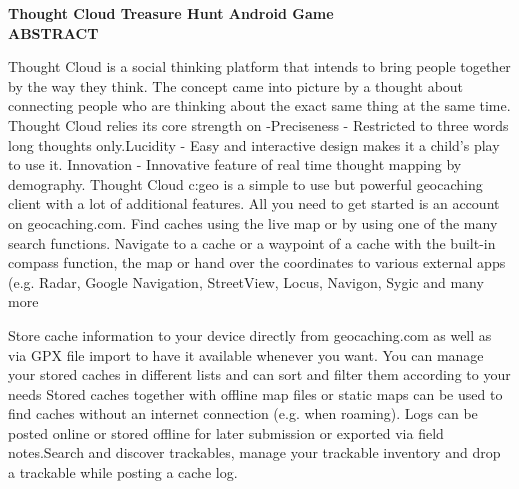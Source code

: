 
\begin{center}
\thispagestyle{empty}
\vspace*{1\baselineskip}

\large{\textbf{Thought Cloud Treasure Hunt Android Game}}\\[1.0cm]
\large{\textbf{ABSTRACT}}\\[0.5cm]
\end{center}
\thispagestyle{empty}
\large{\emph{}

Thought Cloud  is a social thinking platform that intends to bring people together by the way they think. The concept came into picture by a thought about connecting people who are thinking about the exact same thing at the same time.\\ Thought Cloud relies its core strength on -Preciseness - Restricted to three words long thoughts only.Lucidity - Easy and interactive design makes it a child's play to use it. Innovation - Innovative feature of real time thought mapping by demography. Thought Cloud c:geo is a simple to use but powerful geocaching client with a lot of additional features. All you need to get started is an account on geocaching.com. Find caches using the live map or by using one of the many search functions. Navigate to a cache or a waypoint of a cache with the built-in compass function, the map or hand over the coordinates to various external apps (e.g. Radar, Google Navigation, StreetView, Locus, Navigon, Sygic and many more 

Store cache information to your device directly from geocaching.com as well as via GPX file import to have it available whenever you want. You can manage your stored caches in different lists and can sort and filter them according to your needs Stored caches together with offline map files or static maps can be used to find caches without an internet connection (e.g. when roaming).
Logs can be posted online or stored offline for later submission or exported via field notes.Search and discover trackables, manage your trackable inventory and drop a trackable while posting a cache log.\\[1cm]}


